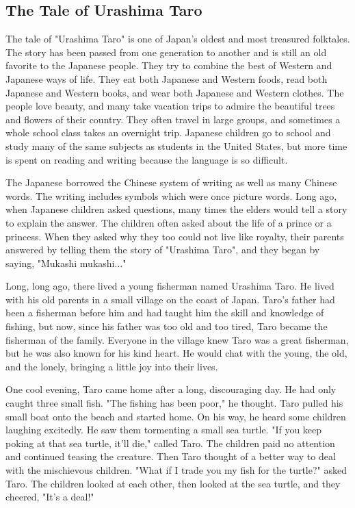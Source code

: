 \subsection{The Tale of Urashima Taro}

The tale of "Urashima Taro" is one of Japan's oldest and most treasured folktales. The story has been passed from one generation to another and is still an old favorite to the Japanese people. They try to combine the best of Western and Japanese ways of life. They eat both Japanese and Western foods, read both Japanese and Western books, and wear both Japanese and Western clothes. The people love beauty, and many take vacation trips to admire the beautiful trees and flowers of their country. They often travel in large groups, and sometimes a whole school class takes an overnight trip. Japanese children go to school and study many of the same subjects as students in the United States, but more time is spent on reading and writing because the language is so difficult.

The Japanese borrowed the Chinese system of writing as well as many Chinese words. The writing includes symbols which were once picture words. Long ago, when Japanese children asked questions, many times the elders would tell a story to explain the answer. The children often asked about the life of a prince or a princess. When they asked why they too could not live like royalty, their parents answered by telling them the story of "Urashima Taro", and they began by saying, "Mukashi mukashi..."

Long, long ago, there lived a young fisherman named Urashima Taro. He lived with his old parents in a small village on the coast of Japan. Taro's father had been a fisherman before him and had taught him the skill and knowledge of fishing, but now, since his father was too old and too tired, Taro became the fisherman of the family. Everyone in the village knew Taro was a great fisherman, but he was also known for his kind heart. He would chat with the young, the old, and the lonely, bringing a little joy into their lives.

One cool evening, Taro came home after a long, discouraging day. He had only caught three small fish. "The fishing has been poor," he thought. Taro pulled his small boat onto the beach and started home. On his way, he heard some children laughing excitedly. He saw them tormenting a small sea turtle. "If you keep poking at that sea turtle, it'll die," called Taro. The children paid no attention and continued teasing the creature. Then Taro thought of a better way to deal with the mischievous children. "What if I trade you my fish for the turtle?" asked Taro. The children looked at each other, then looked at the sea turtle, and they cheered, "It's a deal!"

